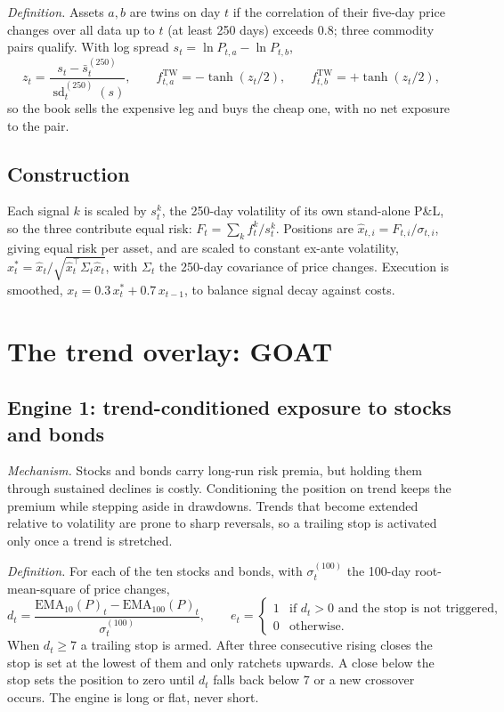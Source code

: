 \documentclass[10.5pt,a4paper]{article}
\begin{document}
\textit{Definition.} Assets $a,b$ are twins on day $t$ if the correlation of their five-day price changes over all data up to $t$ (at least 250 days) exceeds 0.8; three commodity pairs qualify. With log spread $s_t=\ln P_{t,a}-\ln P_{t,b}$,
\begin{equation}
z_t=\frac{s_t-\bar s^{(250)}_t}{\operatorname{sd}^{(250)}_t(s)},\qquad
f^{\mathrm{TW}}_{t,a}=-\tanh(z_t/2),\qquad f^{\mathrm{TW}}_{t,b}=+\tanh(z_t/2),
\end{equation}
so the book sells the expensive leg and buys the cheap one, with no net exposure to the pair.

\subsection{Construction}
Each signal $k$ is scaled by $s^k_t$, the 250-day volatility of its own stand-alone P\&L, so the three contribute equal risk: $F_t=\sum_k f^k_t/s^k_t$. Positions are $\hat x_{t,i}=F_{t,i}/\sigma_{t,i}$, giving equal risk per asset, and are scaled to constant ex-ante volatility, $x^*_t=\hat x_t/\sqrt{\hat x_t^{\top}\Sigma_t\hat x_t}$, with $\Sigma_t$ the 250-day covariance of price changes. Execution is smoothed, $x_t=0.3\,x^*_t+0.7\,x_{t-1}$, to balance signal decay against costs.

\section{The trend overlay: GOAT}
\subsection{Engine 1: trend-conditioned exposure to stocks and bonds}
\textit{Mechanism.} Stocks and bonds carry long-run risk premia, but holding them through sustained declines is costly. Conditioning the position on trend keeps the premium while stepping aside in drawdowns. Trends that become extended relative to volatility are prone to sharp reversals, so a trailing stop is activated only once a trend is stretched.

\textit{Definition.} For each of the ten stocks and bonds, with $\sigma^{(100)}_t$ the 100-day root-mean-square of price changes,
\begin{equation}
d_t=\frac{\mathrm{EMA}_{10}(P)_t-\mathrm{EMA}_{100}(P)_t}{\sigma^{(100)}_t},\qquad
e_t=\begin{cases}1 & \text{if } d_t>0 \text{ and the stop is not triggered},\\ 0 & \text{otherwise.}\end{cases}
\end{equation}
When $d_t\ge 7$ a trailing stop is armed. After three consecutive rising closes the stop is set at the lowest of them and only ratchets upwards. A close below the stop sets the position to zero until $d_t$ falls back below 7 or a new crossover occurs. The engine is long or flat, never short.
\end{document}
